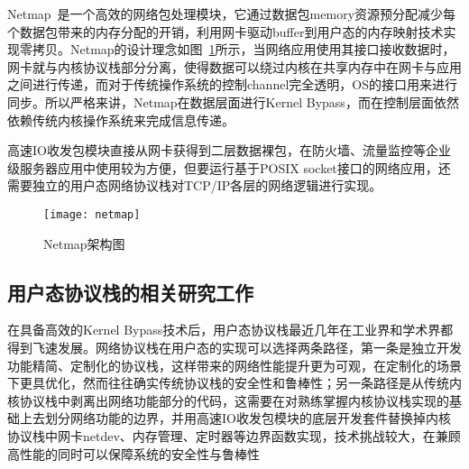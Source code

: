 Netmap~\cite{NetMap}是一个高效的网络包处理模块，它通过数据包memory资源预分配减少每个数据包带来的内存分配的开销，利用网卡驱动buffer到用户态的内存映射技术实现零拷贝。Netmap的设计理念如图~\ref{fig:netmap}所示，当网络应用使用其接口接收数据时，网卡就与内核协议栈部分分离，使得数据可以绕过内核在共享内存中在网卡与应用之间进行传递，而对于传统操作系统的控制channel完全透明，OS的接口用来进行同步。所以严格来讲，Netmap在数据层面进行Kernel Bypass，而在控制层面依然依赖传统内核操作系统来完成信息传递。

高速IO收发包模块直接从网卡获得到二层数据裸包，在防火墙、流量监控等企业级服务器应用中使用较为方便，但要运行基于POSIX socket接口的网络应用，还需要独立的用户态网络协议栈对TCP/IP各层的网络逻辑进行实现。

\vspace{-10pt}
\begin{figure}[H] %
  \centering
  \texttt{[image: netmap]}
  \caption{Netmap架构图}
  \label{fig:netmap}
\end{figure}
\vspace{-10pt}

\subsection{用户态协议栈的相关研究工作}
\label{subsec:02_userspace_related_work}

在具备高效的Kernel Bypass技术后，用户态协议栈最近几年在工业界和学术界都得到飞速发展。网络协议栈在用户态的实现可以选择两条路径，第一条是独立开发功能精简、定制化的协议栈，这样带来的网络性能提升更为可观，在定制化的场景下更具优化，然而往往确实传统协议栈的安全性和鲁棒性；另一条路径是从传统内核协议栈中剥离出网络功能部分的代码，这需要在对熟练掌握内核协议栈实现的基础上去划分网络功能的边界，并用高速IO收发包模块的底层开发套件替换掉内核协议栈中网卡netdev、内存管理、定时器等边界函数实现，技术挑战较大，在兼顾高性能的同时可以保障系统的安全性与鲁棒性


